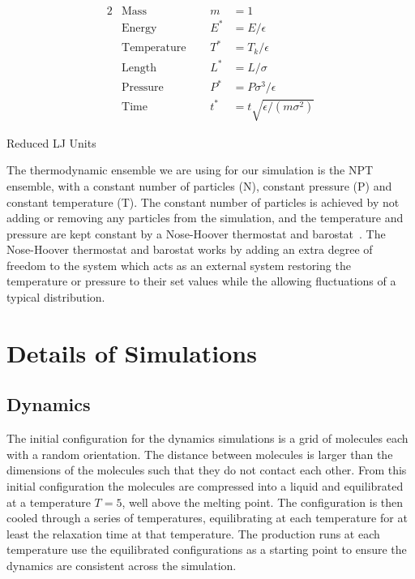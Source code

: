 \begin{table}
    \centering
    \begin{alignat*}{2}
        &\text{Mass} & m &= 1 \\
        &\text{Energy} & E^* &= E/\epsilon \\
        &\text{Temperature  }\quad& T^* &= T_k/\epsilon \\
        &\text{Length} & L^* &= L/\sigma \\
        &\text{Pressure} & P^* &= P\sigma^3/\epsilon \\
        &\text{Time} & t^* &= t\sqrt{\epsilon/(m\sigma^2)}
    \end{alignat*}
    \caption{Reduced LJ Units}
    \label{tab:reduced units}
\end{table}


The thermodynamic ensemble we are using for our simulation is the NPT ensemble, with a constant number of particles (N), constant pressure (P) and constant temperature (T). The constant number of particles is achieved by not adding or removing any particles from the simulation, and the temperature and pressure are kept constant by a Nose-Hoover thermostat and barostat~\cite{nose:84,hoover:85}. The Nose-Hoover thermostat and barostat works by adding an extra degree of freedom to the system which acts as an external system restoring the temperature or pressure to their set values while the allowing fluctuations of a typical distribution.

\section{Details of Simulations}

\subsection{Dynamics}

The initial configuration for the dynamics simulations is a grid of molecules each with a random orientation. The distance between molecules is larger than the dimensions of the molecules such that they do not contact each other. From this initial configuration the molecules are compressed into a liquid and equilibrated at a temperature $T=5$, well above the melting point. The configuration is then cooled through a series of temperatures, equilibrating at each temperature for at least the relaxation time at that temperature. The production runs at each temperature use the equilibrated configurations as a starting point to ensure the dynamics are consistent across the simulation.

